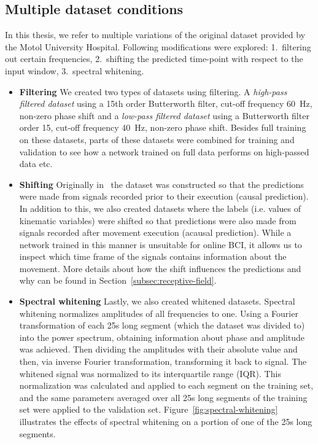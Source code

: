 \subsection{Multiple dataset conditions}\label{subsec:modifications-to-the-dataset}
In this thesis, we refer to multiple variations of the original dataset provided by the Motol University Hospital.
Following modifications were explored:
1.~filtering out certain frequencies, 2.~shifting the predicted time-point with respect to the input window, 3.~spectral whitening.
\begin{itemize}
\item \textbf{Filtering} We created two types of datasets using filtering.
A \textit{high-pass filtered dataset} using a 15th order Butterworth filter, cut-off frequency 60~Hz, non-zero phase shift and a \textit{low-pass filtered dataset} using a Butterworth filter order 15, cut-off frequency 40~Hz, non-zero phase shift.
Besides full training on these datasets, parts of these datasets were combined for training and validation to see how a network trained on full data performs on high-passed data etc.
\\

\item \textbf{Shifting} Originally in~\cite{Hammer-2021} the dataset was constructed so that the predictions were made from signals recorded prior to their execution (causal prediction).
In addition to this, we also created datasets where the labels (i.e. values of kinematic variables) were shifted so that predictions were also made from signals recorded after movement execution (acausal prediction).
While a network trained in this manner is unsuitable for online BCI, it allows us to inspect which time frame of the signals contains information about the movement.
More details about how the shift influences the predictions and why can be found in Section~\ref{subsec:receptive-field}. \\

\item \textbf{Spectral whitening} Lastly, we also created whitened datasets.
Spectral whitening normalizes amplitudes of all frequencies to one.
Using a Fourier transformation of each 25s long segment (which the dataset was divided to) into the power spectrum, obtaining information about phase and amplitude was achieved.
Then dividing the amplitudes with their absolute value and then, via inverse Fourier transformation, transforming it back to signal.
The whitened signal was normalized to its interquartile range (IQR).
This normalization was calculated and applied to each segment on the training set, and the same parameters averaged over all 25s long segments of the training set were applied to the validation set.
Figure~\ref{fig:spectral-whitening} illustrates the effects of spectral whitening on a portion of one of the 25s long segments.
\end{itemize}

